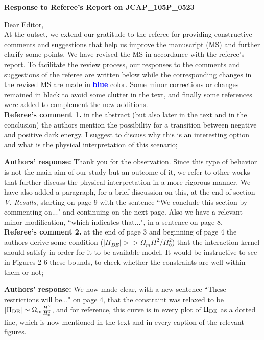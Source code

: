 \documentclass[10pt,fleqn]{report}
\begin{document}
\begin{center}
\textbf{Response to Referee's Report on JCAP\_105P\_0523}
\end{center}

\noindent Dear Editor,\\

At the outset,  we extend our gratitude to the referee for providing constructive comments and suggestions that help us improve the manuscript (MS) and further clarify some points. We have revised the MS in accordance with the referee's report. To  facilitate the review process, our responses to the comments and suggestions of the referee are written below while the corresponding changes in the revised MS are made in \textbf{\textcolor{blue}{blue}} color. Some minor corrections or changes remained in black to avoid some clutter in the text, and finally some references were added to complement the new additions.\\


\noindent\textbf{Referee's comment 1.} in the abstract (but also later in the text and in the conclusion) the authors mention the possibility for a transition between negative and positive dark energy. I suggest to discuss why this is an interesting option and what is the physical interpretation of this scenario;

\noindent\textbf{Authors'  response:} Thank you for the observation. Since this type of behavior is not the main aim of our study but an outcome of it, we refer to other works that further discuss the physical interpretation in a more rigorous manner. We have also added a paragraph, for a brief discussion on this, at the end of section \textit{V. Results}, starting on page 9 with the sentence ``We conclude this section by commenting on..." and continuing on the next page. Also we have a relevant minor modification, ``which indicates that...", in a sentence on page 8.
\\

\noindent\textbf{Referee's comment 2.} at the end of page 3 and beginning of page 4 the authors derive some condition ($|\Pi_{DE}| >> \Omega_m H^2/H^2_0$) that the interaction kernel should satisfy in order for it to be available model. It would be instructive to see in Figures 2-6 these bounds, to check whether the constraints are well within them or not;

\noindent\textbf{Authors'  response:}  We now made clear, with a new sentence ``These restrictions will be..." on page 4, that the constraint was relaxed to be $|\Pi_{\rm DE} | \sim \Omega_{\rm m}\frac{H^2}{H_0^2}$, and for reference, this curve is in every plot of $\Pi_{\rm DE}$ as a dotted line, which is now mentioned in the text and in every caption of the relevant figures.
\\
\end{document}
